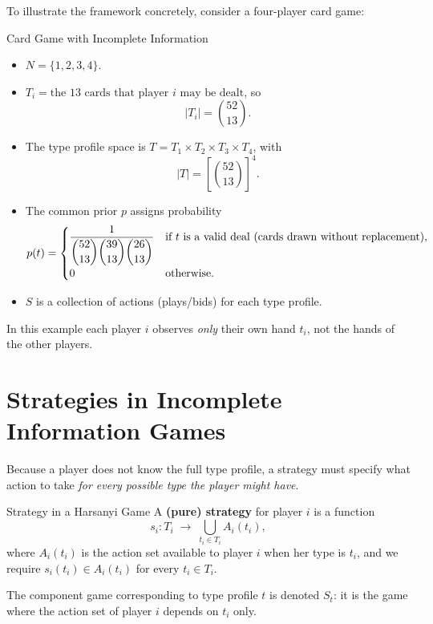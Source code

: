\documentclass[12pt, a4paper]{article}
\begin{document}
To illustrate the framework concretely, consider a four-player card game:

\begin{exbox}{Card Game with Incomplete Information}
\begin{itemize}
  \item $N = \{1, 2, 3, 4\}$.
  \item $T_i = \text{the 13 cards that player }i\text{ may be dealt}$, so
        \[
          |T_i| = \binom{52}{13}.
        \]
  \item The type profile space is $T = T_1 \times T_2 \times T_3 \times T_4$, with
        \[
          |T| = \left[\binom{52}{13}\right]^4.
        \]
  \item The common prior $p$ assigns probability
        \[
          p(t) =
          \begin{cases}
            \dfrac{1}{\dbinom{52}{13}\dbinom{39}{13}\dbinom{26}{13}} & \text{if $t$ is a valid deal (cards drawn without replacement),} \\[8pt]
            0 & \text{otherwise.}
          \end{cases}
        \]
  \item $S$ is a collection of actions (plays/bids) for each type profile.
\end{itemize}
\end{exbox}

\begin{notebox}
  In this example each player $i$ observes \emph{only} their own hand $t_i$, not the hands of the other players.
\end{notebox}

\section{Strategies in Incomplete Information Games}

Because a player does not know the full type profile, a strategy must specify what action to take \emph{for every possible type the player might have}.

\begin{defbox}{Strategy in a Harsanyi Game}
A \textbf{(pure) strategy} for player $i$ is a function
\[
  s_i : T_i \;\longrightarrow\; \bigcup_{t_i \in T_i} A_i(t_i),
\]
where $A_i(t_i)$ is the action set available to player $i$ when her type is $t_i$, and we require $s_i(t_i) \in A_i(t_i)$ for every $t_i \in T_i$.

The component game corresponding to type profile $t$ is denoted $S_t$: it is the game where the action set of player $i$ depends on $t_i$ only.
\end{defbox}
\end{document}
